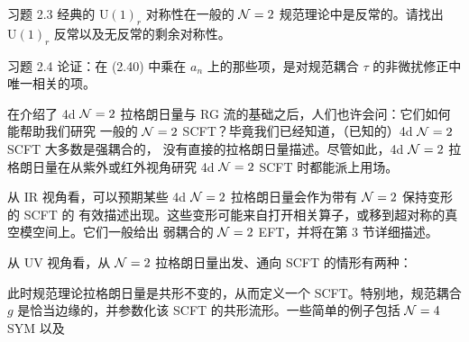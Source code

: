 
\begin{exercisebox}{习题 2.3}
  经典的 $\mathrm{U}(1)_r$ 对称性在一般的 $\mathcal{N}=2$ 规范理论中是反常的。请找出
  $\mathrm{U}(1)_r$ 反常以及无反常的剩余对称性。
\end{exercisebox}

\begin{exercisebox}{习题 2.4}
  论证：在 (2.40) 中乘在 $a_n$ 上的那些项，是对规范耦合 $\tau$ 的非微扰修正中唯一相关的项。
\end{exercisebox}



在介绍了 4d $\mathcal{N}=2$ 拉格朗日量与 RG 流的基础之后，人们也许会问：它们如何能帮助我们研究
一般的 $\mathcal{N}=2$ SCFT？毕竟我们已经知道，（已知的）4d $\mathcal{N}=2$ SCFT 大多数是强耦合的，
没有直接的拉格朗日量描述。尽管如此，4d $\mathcal{N}=2$ 拉格朗日量在从紫外或红外视角研究
4d $\mathcal{N}=2$ SCFT 时都能派上用场。

从 IR 视角看，可以预期某些 4d $\mathcal{N}=2$ 拉格朗日量会作为带有 $\mathcal{N}=2$ 保持变形的 SCFT 的
有效描述出现。这些变形可能来自打开相关算子，或移到超对称的真空模空间上。它们一般给出
弱耦合的 $\mathcal{N}=2$ EFT，并将在第 3 节详细描述。

从 UV 视角看，从 $\mathcal{N}=2$ 拉格朗日量出发、通向 SCFT 的情形有两种：

此时规范理论拉格朗日量是共形不变的，从而定义一个 SCFT。特别地，规范耦合 $g$
是恰当边缘的，并参数化该 SCFT 的共形流形。一些简单的例子包括 $\mathcal{N}=4$ SYM 以及

